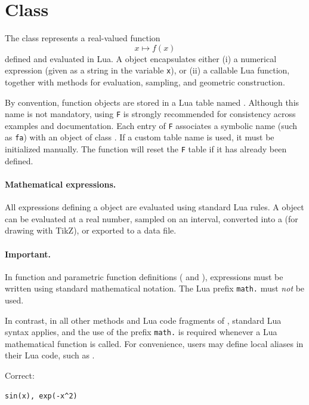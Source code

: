 \newpage
\section{Class }
\label{sec:class_fct}

The  class represents a real-valued function
\[
x \longmapsto f(x)
\]
defined and evaluated in Lua. A  object encapsulates either
(i) a numerical expression (given as a string in the variable \texttt{x}),
or (ii) a callable Lua function, together with methods for evaluation,
sampling, and geometric construction.

By convention, function objects are stored in a Lua table named
. Although this name is not mandatory, using \texttt{F} is
strongly recommended for consistency across examples and documentation.
Each entry of \texttt{F} associates a symbolic name (such as \texttt{fa})
with an object of class . If a custom table name is used, it
must be initialized manually. The 
function will reset the \texttt{F} table if it has already been defined.

\paragraph{Mathematical expressions.}
All expressions defining a  object are evaluated using standard
Lua rules. A  object can be evaluated at a real number, sampled on an
interval, converted into a  (for drawing with TikZ), or exported
to a data file.

\paragraph{Important.}
In function and parametric function definitions
( and ),
expressions must be written using standard mathematical notation.
The Lua prefix \texttt{math.} must \emph{not} be used.

In contrast, in all other methods and Lua code fragments of
,
standard Lua syntax applies, and the use of the prefix \texttt{math.}
is required whenever a Lua mathematical function is called. For convenience, users may define local aliases in their Lua code, such as
.


\medskip
Correct:
\begin{verbatim}
sin(x), exp(-x^2)
\end{verbatim}


